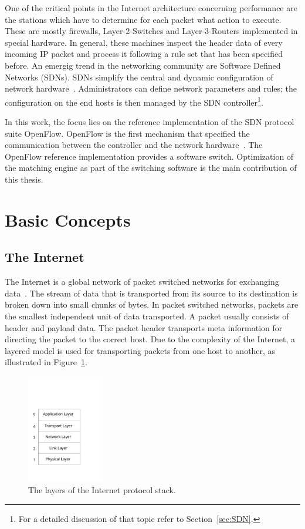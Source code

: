 \documentclass[a4paper,
		12pt,
		parskip=full,
		titlepage
		]{scrartcl}
\begin{document}
One of the critical points in the Internet architecture concerning performance 
are the stations which have to determine for each packet what action to execute.
These are mostly firewalls, Layer-2-Switches and Layer-3-Routers implemented in special hardware.
In general, these machines inspect the header data of every incoming IP packet and process it 
following a rule set that has been specified before.
An emergig trend in the networking community are Software Defined Networks (SDNs).
SDNs simplify the central and dynamic configuration of network hardware~\cite{onf_whitepaper}.
Administrators can define network parameters and rules; the configuration 
on the end hosts is then managed by the SDN controller\footnote{For a detailed discussion of that topic refer to Section~\ref{sec:SDN}.}.

In this work, the focus lies on the reference implementation of the SDN protocol suite OpenFlow.
OpenFlow is the first mechanism that specified the communication between the controller and the network hardware~\cite{onf_whitepaper}.
The OpenFlow reference implementation provides a software switch.
Optimization of the matching engine as part of the switching software is the main contribution of this thesis.

\section{Basic Concepts}
\subsection{The Internet}
The Internet is a global network of packet switched networks for exchanging data~\cite[Chapter 1.1]{kurose_ross}. 
The stream of data that is transported from its source to its destination is broken down into small chunks of bytes.
In packet switched networks, packets are the smallest independent unit of data transported.
A packet usually consists of header and payload data.
The packet header transports meta information for directing the packet to the correct host.
Due to the complexity of the Internet, a layered model is used for transporting 
packets from one host to another, as illustrated in Figure~\ref{fig:layermodel}.

\begin{figure}[H]
\centering
\includegraphics[width=0.3\textwidth]{images/internet-layers}
\caption{The layers of the Internet protocol stack.}
\label{fig:layermodel}
\end{figure}
\end{document}
